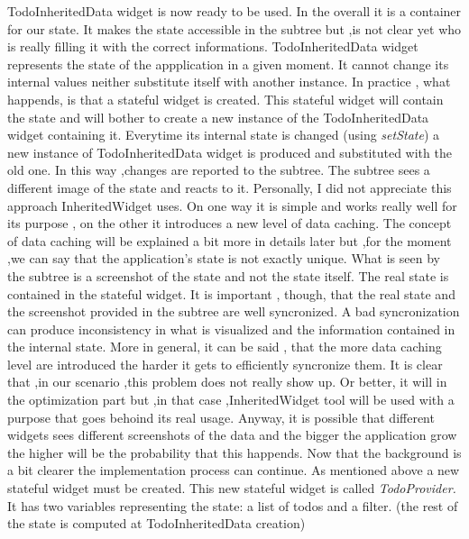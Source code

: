 \mbox{}
TodoInheritedData widget is now ready to be used. In the overall it is a container for our state. It makes the state accessible in the subtree but ,is not clear yet who is really filling it with the correct informations. TodoInheritedData widget represents the state of the appplication in a given moment. It cannot change its internal values neither substitute itself with another instance. In practice , what happends, is that a stateful widget is created. This stateful widget will contain the state and will bother to create a new instance of the TodoInheritedData widget containing it. Everytime its internal state is changed (using \textit{setState}) a new instance of TodoInheritedData widget is produced and substituted with the old one. In this way ,changes are reported to the subtree. The subtree sees a different image of the state and reacts to it. Personally, I did not appreciate this approach InheritedWidget uses. On one way it is simple and works really well for its purpose , on the other it introduces a new level of data caching. The concept of data caching will be explained a bit more in details later but ,for the moment ,we can say that the application's state is not exactly unique. What is seen by the subtree is a screenshot of the state and not the state itself. The real state is contained in the stateful widget. It is important , though, that the real state and the screenshot provided in the subtree are well syncronized. A bad syncronization can produce inconsistency in what is visualized and the information contained in the internal state. More in general, it can be said , that the more data caching level are introduced the harder it gets to efficiently syncronize them. It is clear that ,in our scenario ,this problem does not really show up. Or better, it will in the optimization part but ,in that case ,InheritedWidget tool will be used with a purpose that goes behoind its real usage. Anyway, it is possible that different widgets sees different screenshots of the data and the bigger the application grow the higher will be the probability that this happends. Now that the background is a bit clearer the implementation process can continue. As mentioned above a new stateful widget must be created. This new stateful widget is called \textit{TodoProvider.} It has two variables representing the state: a list of todos and a filter. (the rest of the state is computed at TodoInheritedData creation)
\mbox{}\\
